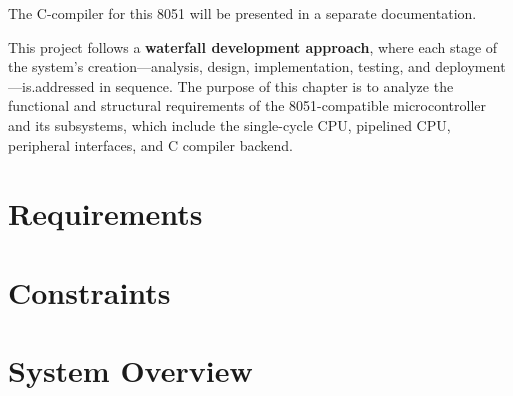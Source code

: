 \vspace{0.5cm}
The C-compiler for this 8051 will be presented in a separate documentation.
\vspace{0.5cm}

This project follows a \textbf{waterfall development approach}, 
where each stage of the system's creation—analysis, design, implementation, testing, 
and deployment—is.addressed in sequence. The purpose of this chapter is to analyze the functional 
and structural requirements of the 8051-compatible microcontroller and its subsystems, which 
include the single-cycle CPU, pipelined CPU, peripheral interfaces, and C compiler backend.


\section {Requirements}

\section {Constraints}

\section{System Overview}